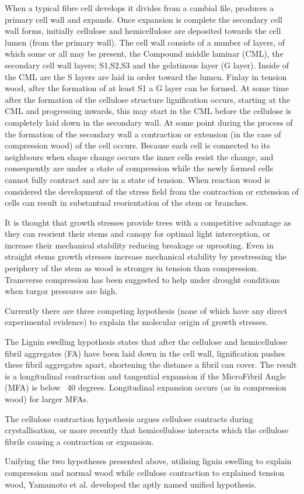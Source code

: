 \documentclass{article}
\begin{document}
When a typical fibre cell develops it divides from a cambial file, produces a
primary cell wall and expands. Once expansion is complete the secondary
cell wall forms, initially cellulose and hemicellulose are deposited towards
the cell lumen (from the primary wall). The cell wall consists of a number of
layers, of which some or all may be present, the Compound middle laminar (CML),
the secondary cell wall layers; S1,S2,S3 and the gelatinous layer (G layer).
Inside of the CML are the S layers are laid in order toward the lumen. Finlay
in tension wood, after the formation of at least S1 a G layer can be formed. At
some time after the formation of the cellulose structure lignification occurs,
starting at the CML and progressing inwards, this may start in the CML before
the cellulose is completely laid down in the secondary wall. At some point during
the process of the formation of the secondary wall a contraction or extension (in
the case of compression wood) of the cell occurs. Because each cell is connected
to its neighbours when shape change occurs the inner cells resist the change, and
consequently are under a state of compression while the newly formed cells
cannot fully contract and are in a state of tension. When reaction wood is
considered the development of the stress field from the contraction or
extension of cells can result in substantual reorientation of the stem or branches.

It is thought that growth stresses provide trees with a competitive
advantage as they can reorient their stems and canopy for optimal light
interception, or increase their mechanical stability reducing breakage or
uprooting. Even in straight stems growth stresses increase mechanical stability
by prestressing the periphery of the stem as wood is stronger in tension than
compression. Transverse compression has been suggested to help under drought
conditions when turgor pressures are high.

Currently there are three competing hypothesis (none of which have any direct
experimental evidence) to explain the molecular origin of growth stresses.

The Lignin swelling hypothesis states that after the cellulose and hemicellulose
fibril aggregates (FA) have been laid down in the cell wall, lignification
pushes these fibril aggregates apart, shortening the distance a fibril can
cover. The result is a longitudinal contraction and tangential expansion if the
MicroFibril Angle (MFA) is below ~40 degrees. Longitudinal expansion occurs
(as in compression wood) for larger MFAs.

The cellulose contraction hypothesis argues cellulose contracts during
crystallisation, or more recently that hemicellulose interacts which the
cellulose fibrils causing a contraction or expansion.

Unifying the two hypotheses presented above, utilising lignin swelling to
explain compression and normal wood while cellulose contraction to explained
tension wood, Yamamoto et al. developed the aptly named unified hypothesis.
\end{document}
